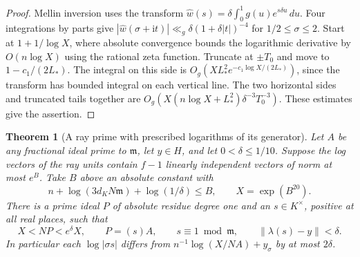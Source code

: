 \documentclass[a4paper,11pt]{article}
\newtheorem{theorem}[proposition]{Theorem}
\theoremstyle{definition}
\theoremstyle{remark}
\numberwithin{equation}{section}
\begin{document}
\begin{proof}
Mellin inversion uses the transform
\(\widehat w(s)=\delta\int_0^1g(u)e^{s\delta u}\,du\).
Four integrations by parts give
\(|\widehat w(\sigma+\mathrm it)|\ll_g \delta(1+\delta |t|)^{-4}\)
for \(1/2\le\sigma\le2\). Start at \(1+1/\log X\), where absolute
convergence bounds the logarithmic derivative by \(O(n\log X)\)
using the rational zeta function. Truncate at \(\pm T_0\) and
move to \(1-c_1/(2L_*)\). The integral on this side is
\(O_g(X L_*^2 e^{-c_1\log X/(2L_*)})\), since the transform has
bounded integral on each vertical line. The two horizontal sides
and truncated tails together are
\(O_g(X(n\log X+L_*^2)\delta^{-3}T_0^{-3})\). These estimates
give the assertion.
\end{proof}

\begin{theorem}[A ray prime with prescribed logarithms of its generator]
\label{thm:sector234}
Let \(A\) be any fractional ideal prime to \(\mathfrak m\), let
\(y\in H\), and let \(0<\delta\le1/10\). Suppose the log vectors
of the ray units contain \(f-1\) linearly independent vectors of
norm at most \(e^B\). Take \(B\) above an absolute constant with
\[
     n+\log(3d_K N\mathfrak m)+\log(1/\delta)\le B,
       \qquad X=\exp(B^{20}).
\]
There is a prime ideal \(P\) of absolute residue degree one and an
\(s\in K^\times\), positive at all real places, such that
\[
  X<NP<e^\delta X,\qquad P=(s)A,\qquad
  s\equiv1\bmod\mathfrak m,\qquad \|\lambda(s)-y\|<\delta .
\]
In particular each \(\log|\sigma s|\) differs from
\(n^{-1}\log(X/NA)+y_\sigma\) by at most \(2\delta\).
\end{theorem}
\end{document}
